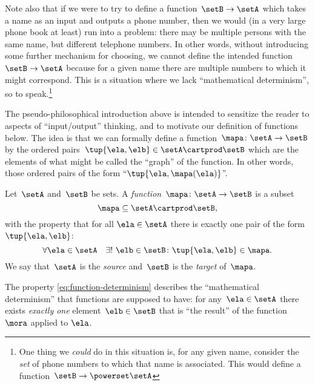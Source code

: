 Note also that if we were to try to define a function~$\setB \to \setA$ which takes a name as an input and outputs a phone number, then we would (in a very large phone book at least) run into a problem: there may be multiple persons with the same name, but different telephone numbers.
In other words, without introducing some further mechanism for choosing, we cannot define the intended function~$\setB \to \setA$ because for a given name there are multiple numbers to which it might correspond.
This is a situation where we lack ``mathematical determinism'', so to speak.\footnote{One thing we \emph{could} do in this situation is, for any given name, consider the \emph{set} of phone numbers to which that name is associated.
    This would define a function~$\setB \to \powerset \setA$}

The pseudo-philosophical introduction above is intended to sensitize the reader to aspects of ``input/output'' thinking, and to motivate our definition of functions below.
The idea is that we can formally define a function~$\mapa\colon \setA \to \setB$ by the ordered pairs~$\tup{\ela, \elb} \in \setA \cartprod \setB$ which are the elements of what might be called the ``graph'' of the function.
In other words, those ordered pairs of the form ``$\tup{\ela, \mapa(\ela)}$''.

\begin{ctdefinition}
    \label{def:function}
    Let~$\setA$ and~$\setB$ be sets.
    A \emph{function}~$\mapa\colon \setA \to \setB$ is a subset
    \begin{equation*}
        \mapa \subseteq \setA \cartprod \setB,
    \end{equation*}
    with the property that for all $\ela \in \setA$ there is exactly one pair of the form~$\tup{\ela,\elb}$:
    \begin{equation}
        \label{eq:function-determinism}
        \forall \ela \in \setA  \quad  \exists ! \ \elb \in \setB \colon \tup{\ela,\elb} \in \mapa.
    \end{equation}
    We say that~$\setA$ is the \emph{source} and~$\setB$ is the \emph{target} of~$\mapa$.
\end{ctdefinition}



The property \cref{eq:function-determinism} describes the ``mathematical determinism'' that functions are supposed to have: for any~$\ela \in \setA$ there exists \emph{exactly one} element~$\elb \in \setB$ that is ``the result'' of the function $\mora$ applied to $\ela$.

